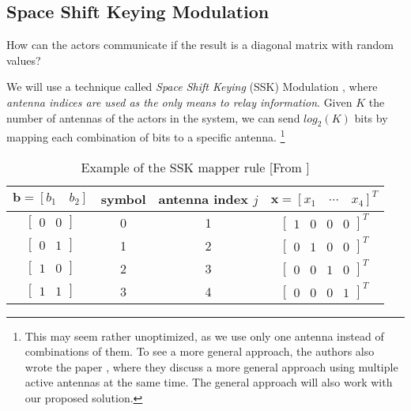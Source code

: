 \subsection{Space Shift Keying Modulation
}

How can the actors communicate if the result is a diagonal matrix with random values?

We will use a technique called \textit{Space Shift Keying} (SSK) Modulation \cite{5165332}, where \textit{antenna indices are used as the only means to relay information}. Given $K$ the number of antennas of the actors in the system, we can send $log_2(K)$ bits by mapping each combination of bits to a specific antenna.
\footnote{This may seem rather unoptimized, as we use only one antenna instead of combinations of them. To see a more general approach, the authors also wrote the paper \cite{4699782}, where they discuss a more general approach using multiple active antennas at the same time. The general approach will also work with our proposed solution.}


\begin{table}[H]
  \centering
  \caption{Example of the SSK mapper rule [From \cite{5165332}]}
  \label{tab:ssk_mapper}
  \begin{tabular}{c|c|c|c}
    $\mathbf{b} = [b_1 \quad b_2]$        & symbol & antenna index $j$ & $\mathbf{x} = [x_1 \quad \cdots \quad x_4]^T$   \\
    \hline
    $\begin{bmatrix} 0 & 0 \end{bmatrix}$ & 0      & 1                 & $\begin{bmatrix} 1 & 0 & 0 & 0 \end{bmatrix}^T$ \\
    $\begin{bmatrix} 0 & 1 \end{bmatrix}$ & 1      & 2                 & $\begin{bmatrix} 0 & 1 & 0 & 0 \end{bmatrix}^T$ \\
    $\begin{bmatrix} 1 & 0 \end{bmatrix}$ & 2      & 3                 & $\begin{bmatrix} 0 & 0 & 1 & 0 \end{bmatrix}^T$ \\
    $\begin{bmatrix} 1 & 1 \end{bmatrix}$ & 3      & 4                 & $\begin{bmatrix} 0 & 0 & 0 & 1 \end{bmatrix}^T$ \\
  \end{tabular}
\end{table}

